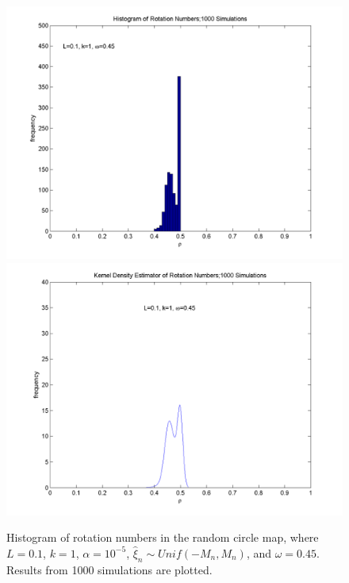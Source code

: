 \begin{figure}[H]\linespread{1}
\caption[Histogram and kernel density estimator of rotation numbers in the random circle
map, $\alpha = 10^{-5}$]{Histogram of rotation numbers in the random circle map, where
  $L=0.1$, $k=1$, $\alpha = 10^{-5}$, $\hat{\xi}_n\sim
  Unif(-M_n,M_n)$, and $\omega = 0.45$. Results from 1000 simulations
  are plotted.}\label{fig:kde1_u}
\centering
\includegraphics[width=.5\textwidth]{figs/hist_rho_k1_L01_om045.png}\hfill
\includegraphics[width=.5\textwidth]{figs/kde_rho_k1_L01_om045.png}
\end{figure}

